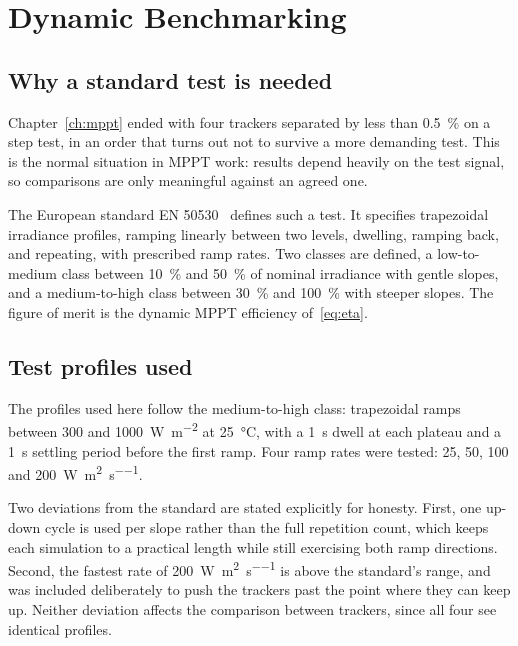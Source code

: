 \chapter{Dynamic Benchmarking}
\label{ch:benchmark}

\section{Why a standard test is needed}

Chapter~\ref{ch:mppt} ended with four trackers separated by less than
\SI{0.5}{\percent} on a step test, in an order that turns out not to survive a
more demanding test. This is the normal situation in MPPT work: results depend
heavily on the test signal, so comparisons are only meaningful against an agreed
one.

The European standard EN 50530~\cite{en50530} defines such a test. It specifies
trapezoidal irradiance profiles, ramping linearly between two levels, dwelling,
ramping back, and repeating, with prescribed ramp rates. Two classes are
defined, a low-to-medium class between \SI{10}{\percent} and \SI{50}{\percent}
of nominal irradiance with gentle slopes, and a medium-to-high class between
\SI{30}{\percent} and \SI{100}{\percent} with steeper slopes. The figure of
merit is the dynamic MPPT efficiency of~\eqref{eq:eta}.

\section{Test profiles used}

The profiles used here follow the medium-to-high class: trapezoidal ramps
between \SI{300}{} and \SI{1000}{\watt\per\square\metre} at \SI{25}{\celsius},
with a \SI{1}{\second} dwell at each plateau and a \SI{1}{\second} settling
period before the first ramp. Four ramp rates were tested: \SI{25}{},
\SI{50}{}, \SI{100}{} and \SI{200}{\watt\per\square\metre\per\second}.

Two deviations from the standard are stated explicitly for honesty. First, one
up-down cycle is used per slope rather than the full repetition count, which
keeps each simulation to a practical length while still exercising both ramp
directions. Second, the fastest rate of \SI{200}{\watt\per\square\metre\per\second}
is above the standard's range, and was included deliberately to push the
trackers past the point where they can keep up. Neither deviation affects the
comparison between trackers, since all four see identical profiles.

